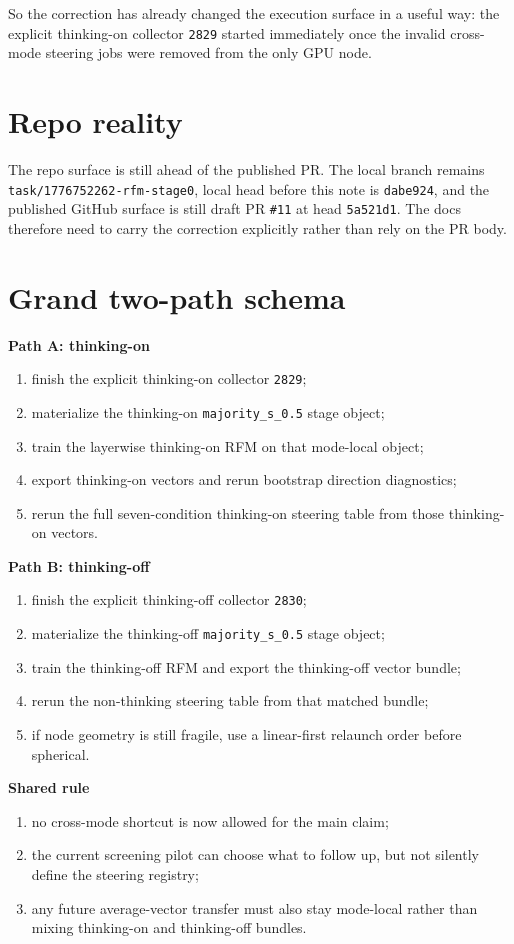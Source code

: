 \documentclass[11pt]{article}
\begin{document}
So the correction has already changed the execution surface in a useful way: the explicit thinking-on collector \texttt{2829} started immediately once the invalid cross-mode steering jobs were removed from the only GPU node.

\section*{Repo reality}
The repo surface is still ahead of the published PR. The local branch remains \texttt{task/1776752262-rfm-stage0}, local head before this note is \texttt{dabe924}, and the published GitHub surface is still draft PR \texttt{\#11} at head \texttt{5a521d1}. The docs therefore need to carry the correction explicitly rather than rely on the PR body.

\section*{Grand two-path schema}
\textbf{Path A: thinking-on}
\begin{enumerate}
\item finish the explicit thinking-on collector \texttt{2829};
\item materialize the thinking-on \texttt{majority\_s\_0.5} stage object;
\item train the layerwise thinking-on RFM on that mode-local object;
\item export thinking-on vectors and rerun bootstrap direction diagnostics;
\item rerun the full seven-condition thinking-on steering table from those thinking-on vectors.
\end{enumerate}

\textbf{Path B: thinking-off}
\begin{enumerate}
\item finish the explicit thinking-off collector \texttt{2830};
\item materialize the thinking-off \texttt{majority\_s\_0.5} stage object;
\item train the thinking-off RFM and export the thinking-off vector bundle;
\item rerun the non-thinking steering table from that matched bundle;
\item if node geometry is still fragile, use a linear-first relaunch order before spherical.
\end{enumerate}

\textbf{Shared rule}
\begin{enumerate}
\item no cross-mode shortcut is now allowed for the main claim;
\item the current screening pilot can choose what to follow up, but not silently define the steering registry;
\item any future average-vector transfer must also stay mode-local rather than mixing thinking-on and thinking-off bundles.
\end{enumerate}
\end{document}
